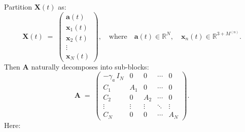 \documentclass[]{scrartcl}
\begin{document}
Partition $\mathbf{X}(t)$ as:
\begin{equation}
\mathbf{X}(t)
\;=\;
\begin{pmatrix}
\mathbf{a}(t) \\[2pt]
\mathbf{x}_1(t)\\
\mathbf{x}_2(t)\\
\vdots\\
\mathbf{x}_N(t)
\end{pmatrix},
\quad
\text{where}
\quad
\mathbf{a}(t)\in\mathbb{R}^{N},
\quad
\mathbf{x}_n(t)\in\mathbb{R}^{3 + M^{(n)}}.
\end{equation}
Then $\mathbf{A}$ naturally decomposes into sub-blocks:
\begin{equation}
\label{eq:Ablock}
\mathbf{A}
\;=\;
\begin{pmatrix}
-\gamma_{a}\,I_{N} & 0 & 0 & \cdots & 0\\[6pt]
C_{1} & A_{1} & 0 & \cdots & 0\\
C_{2} & 0 & A_{2} & \cdots & 0\\
\vdots & \vdots & \vdots & \ddots & \vdots\\
C_{N} & 0 & 0 & \cdots & A_{N}
\end{pmatrix}.
\end{equation}
Here:
\end{document}
